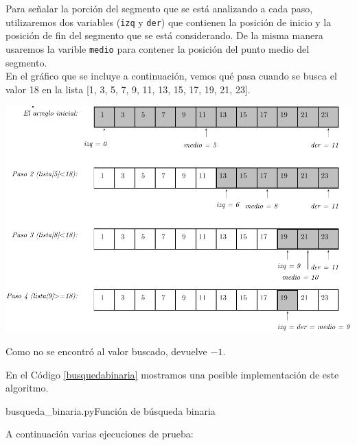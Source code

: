 Para señalar la porción del segmento que se está analizando a cada paso,
utilizaremos dos variables (\lstinline!izq! y \lstinline!der!) que
contienen la posición de inicio y la posición de fin del segmento que se
está considerando. De la misma manera usaremos la varible \lstinline!medio!
para contener la posición del punto medio del segmento. \\

En el gráfico que se incluye a continuación, vemos qué pasa cuando se busca
el valor 18 en la lista [1, 3, 5, 7, 9, 11, 13, 15, 17, 19, 21, 23].

{\centering
\includegraphics{graficos/uni8-seguimiento}
}

Como no se encontró al valor buscado, devuelve $-1$.

En el Código \ref{busquedabinaria} mostramos una posible implementación de
este algoritmo. \\

\begin{codigo}{busqueda\_binaria.py}{Función de búsqueda binaria}
\label{busquedabinaria}

\end{codigo}

A continuación varias ejecuciones de prueba:

